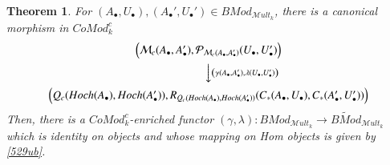 \documentclass[10pt, colorlinks]{article}
\numberwithin{equation}{section} \DeclareMathSizes{2}{10}{12}{13}
\newtheorem{Thm}[thm]{Theorem}
\begin{document}
\begin{Thm}\label{Thm5.17gm}
  For $(A_\bullet,U_\bullet),(A_\bullet',U_\bullet')\in{BMod}_{\mathscr Mult_k}$, there is a canonical morphism in $CoMod_k^c$
  \begin{equation}\label{529ub}
\begin{CD}
       \left(\mathcal M_c(A_\bullet,A_\bullet'),\mathcal P_{\mathcal M_c(A_\bullet,A_\bullet')}(U_\bullet,U_\bullet')\right) 
        \\
        @VV \left(\gamma(A_\bullet,A_\bullet'),\lambda(U_\bullet,U_\bullet')\right)V \\ 
             \Big(Q_c(Hoch(A_\bullet),Hoch(A_\bullet')), 
            R_{Q_c(Hoch(A_\bullet),Hoch(A_\bullet'))}(C_*(A_\bullet,U_\bullet),C_*(A_\bullet',U_\bullet'))\Big)\\
\end{CD}
    \end{equation} 
    Then, there is a $CoMod^c_k$-enriched functor $(\gamma,\lambda): BMod_{\mathscr Mult_k}\longrightarrow \widetilde{BMod}_{\mathscr Mult_k}$ which is identity on objects and whose mapping on Hom objects is given by \eqref{529ub}.  
\end{Thm}
\end{document}
